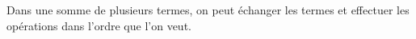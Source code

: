 Dans une somme de plusieurs termes, on peut échanger les termes et
effectuer les opérations dans l'ordre que l'on veut.